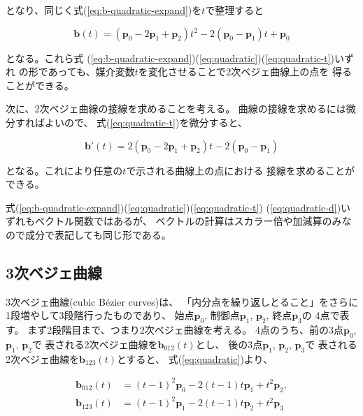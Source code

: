 \documentclass[dvipdfmx]{jsarticle}
\newcommand\VectBold[1]{\boldsymbol{#1}}
\newcommand\VectBold[1]{\symbf{#1}}
\newcommand\Vect[1]{\VectBold{#1}}
\begin{document}
となり、同じく式(\ref{eq:b-quadratic-expand})を$t$で整理すると

\begin{equation}
  \Vect{b}\left(t\right)
  = \left( \Vect{p}_0 - 2\Vect{p}_1 + \Vect{p}_2 \right)t^2
  - 2\left(\Vect{p}_0-\Vect{p}_1\right)t
  + \Vect{p}_0
  \label{eq:quadratic-t}
\end{equation}

となる。これら式
(\ref{eq:b-quadratic-expand})(\ref{eq:quadratic})(\ref{eq:quadratic-t})いずれ
の形であっても、媒介変数$t$を変化させることで2次ベジェ曲線上の点を
得ることができる。

次に、2次ベジェ曲線の接線を求めることを考える。
曲線の接線を求めるには微分すればよいので、
式(\ref{eq:quadratic-t})を微分すると、

\begin{equation}
  \Vect{b}'\left(t\right)
  =
  2\left( \Vect{p}_0 -2\Vect{p}_1 +\Vect{p}_2 \right) t
  -2\left( \Vect{p}_0 - \Vect{p}_1 \right)
  \label{eq:quadratic-d}
\end{equation}

となる。これにより任意の$t$で示される曲線上の点における
接線を求めることができる。

式(\ref{eq:b-quadratic-expand})(\ref{eq:quadratic})(\ref{eq:quadratic-t})%
(\ref{eq:quadratic-d})いずれもベクトル関数ではあるが、
ベクトルの計算はスカラー倍や加減算のみなので成分で表記しても同じ形である。

\subsection{3次ベジェ曲線}

3次ベジェ曲線(cubic Bézier curves)は、
「内分点を繰り返しとること」をさらに1段増やして3段階行ったものであり、
始点$\Vect{p}_0$, 制御点$\Vect{p}_1$, $\Vect{p}_2$, 終点$\Vect{p}_3$の
4点で表す。
まず2段階目まで、つまり2次ベジェ曲線を考える。
4点のうち、前の3点$\Vect{p}_0$, $\Vect{p}_1$, $\Vect{p}_2$で
表される2次ベジェ曲線を$\Vect{b}_{012}\left(t\right)$とし、
後の3点$\Vect{p}_1$, $\Vect{p}_2$, $\Vect{p}_3$で
表される2次ベジェ曲線を$\Vect{b}_{123}\left(t\right)$とすると、
式(\ref{eq:quadratic})より、

\begin{align}
  \Vect{b}_{012}\left(t\right)
  &= \left(t-1\right)^2 \Vect{p}_0
  - 2\left(t-1\right)t \Vect{p}_1
  + t^2 \Vect{p}_2,
  \label{eq:b012}
  \\
  \Vect{b}_{123}\left(t\right)
  &= \left(t-1\right)^2 \Vect{p}_1
  - 2\left(t-1\right)t \Vect{p}_2
  + t^2 \Vect{p}_3
  \label{eq:b123}
\end{align}
\end{document}
